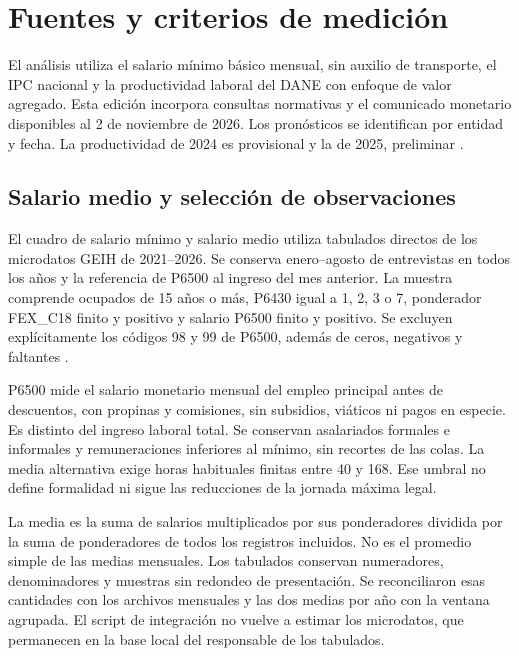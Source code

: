 \section{Fuentes y criterios de medición}

El análisis utiliza el salario mínimo básico mensual, sin auxilio de transporte, el IPC nacional y la productividad laboral del DANE con enfoque de valor agregado. Esta edición incorpora consultas normativas y el comunicado monetario disponibles al 2 de noviembre de 2026. Los pronósticos se identifican por entidad y fecha. La productividad de 2024 es provisional y la de 2025, preliminar \citep{ipc,productividad,decreto1785,salarioHistorico,decreto2613,decreto2024,decreto2025,decreto1469,juntaOctubre}.

\subsection{Salario medio y selección de observaciones}

El cuadro de salario mínimo y salario medio utiliza tabulados directos de los microdatos GEIH de 2021--2026. Se conserva enero--agosto de entrevistas en todos los años y la referencia de P6500 al ingreso del mes anterior. La muestra comprende ocupados de 15 años o más, P6430 igual a 1, 2, 3 o 7, ponderador FEX\_C18 finito y positivo y salario P6500 finito y positivo. Se excluyen explícitamente los códigos 98 y 99 de P6500, además de ceros, negativos y faltantes \citep{geihSalario,geihTabulados}.

P6500 mide el salario monetario mensual del empleo principal antes de descuentos, con propinas y comisiones, sin subsidios, viáticos ni pagos en especie. Es distinto del ingreso laboral total. Se conservan asalariados formales e informales y remuneraciones inferiores al mínimo, sin recortes de las colas. La media alternativa exige horas habituales finitas entre 40 y 168. Ese umbral no define formalidad ni sigue las reducciones de la jornada máxima legal.

La media es la suma de salarios multiplicados por sus ponderadores dividida por la suma de ponderadores de todos los registros incluidos. No es el promedio simple de las medias mensuales. Los tabulados conservan numeradores, denominadores y muestras sin redondeo de presentación. Se reconciliaron esas cantidades con los archivos mensuales y las dos medias por año con la ventana agrupada. El script de integración no vuelve a estimar los microdatos, que permanecen en la base local del responsable de los tabulados.

